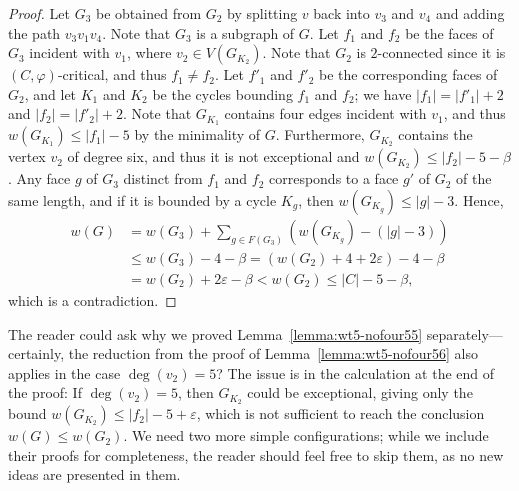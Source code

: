 \documentclass[12pt,twoside,openright,a4paper]{book}
\begin{document}
\begin{proof}
Let $G_3$ be obtained from $G_2$ by splitting $v$ back into $v_3$ and $v_4$ and adding the path $v_3v_1v_4$.
Note that $G_3$ is a subgraph of $G$.  Let $f_1$ and $f_2$ be the faces of $G_3$ incident with $v_1$,
where $v_2\in V(G_{K_2})$.  Note that $G_2$ is $2$-connected since it is $(C,\varphi)$-critical, and thus $f_1\neq f_2$.
Let $f'_1$ and $f'_2$ be the corresponding faces of $G_2$, and let $K_1$ and $K_2$ be the cycles bounding
$f_1$ and $f_2$; we have $|f_1|=|f'_1|+2$ and $|f_2|=|f'_2|+2$.
Note that $G_{K_1}$ contains four edges incident with $v_1$, and thus 
$w(G_{K_1})\le |f_1|-5$ by the minimality of $G$.  Furthermore, $G_{K_2}$ contains the vertex $v_2$ of degree six,
and thus it is not exceptional and $w(G_{K_2})\le |f_2|-5-\beta$.  Any face $g$ of $G_3$ distinct from $f_1$ and $f_2$
corresponds to a face $g'$ of $G_2$ of the same length, and if it is bounded by a cycle $K_g$, then $w(G_{K_g})\le |g|-3$.
Hence,
\begin{align*}
w(G)&=w(G_3)+\sum_{g\in F(G_3)} (w(G_{K_g})-(|g|-3))\\
&\le w(G_3)-4-\beta=(w(G_2)+4+2\varepsilon)-4-\beta\\
&=w(G_2)+2\varepsilon-\beta<w(G_2)\le |C|-5-\beta,
\end{align*}
which is a contradiction.
\end{proof}

The reader could ask why we proved Lemma~\ref{lemma:wt5-nofour55} separately---certainly, the reduction
from the proof of Lemma~\ref{lemma:wt5-nofour56} also applies in the case $\deg(v_2)=5$?
The issue is in the calculation at the end of the proof: If $\deg(v_2)=5$, then $G_{K_2}$ could be exceptional,
giving only the bound $w(G_{K_2})\le |f_2|-5+\varepsilon$, which is not sufficient to reach the conclusion $w(G)\le w(G_2)$.
We need two more simple configurations; while we include their proofs for completeness, the reader should feel free
to skip them, as no new ideas are presented in them.
\end{document}
